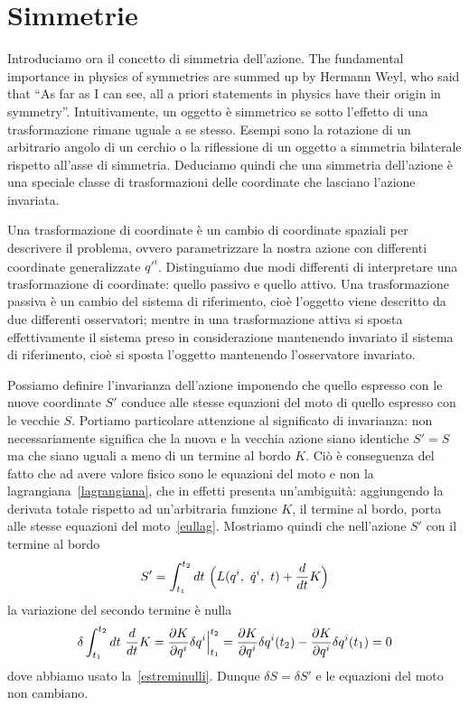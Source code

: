 \section{Simmetrie}
    
    Introduciamo ora il concetto di simmetria dell'azione. The fundamental importance in physics of symmetries are summed up by Hermann Weyl, who said that ``As far as I can see, all a priori statements in physics have their origin in symmetry''. Intuitivamente, un oggetto è simmetrico se sotto l'effetto di una trasformazione rimane uguale a se stesso. Esempi sono la rotazione di un arbitrario angolo di un cerchio o la riflessione di un oggetto a simmetria bilaterale rispetto all'asse di simmetria. Deduciamo quindi che una simmetria dell'azione è una speciale classe di trasformazioni delle coordinate che lasciano l'azione invariata. 
    
    Una trasformazione di coordinate è un cambio di coordinate spaziali per descrivere il problema, ovvero parametrizzare la nostra azione con differenti coordinate generalizzate $q'^i$. Distinguiamo due modi differenti di interpretare una trasformazione di coordinate: quello passivo e quello attivo. Una trasformazione passiva è un cambio del sistema di riferimento, cioè l'oggetto viene descritto da due differenti osservatori; mentre in una trasformazione attiva si sposta effettivamente il sistema preso in considerazione mantenendo invariato il sistema di riferimento, cioè si sposta l'oggetto mantenendo l'osservatore invariato. 
    
    Possiamo definire l'invarianza dell'azione imponendo che quello espresso con le nuove coordinate $S'$ conduce alle stesse equazioni del moto di quello espresso con le vecchie $S$. Portiamo particolare attenzione al significato di invarianza: non necessariamente significa che la nuova e la vecchia azione siano identiche $S' = S$ ma che siano uguali a meno di un termine al bordo $K$. Ciò è conseguenza del fatto che ad avere valore fisico sono le equazioni del moto e non la lagrangiana~\eqref{lagrangiana}, che in effetti presenta un'ambiguità: aggiungendo la derivata totale rispetto ad un'arbitraria funzione $K$, il termine al bordo, porta alle stesse equazioni del moto~\eqref{eullag}. Mostriamo quindi che nell'azione $S'$ con il termine al bordo
    \begin{equation*}
        S' = \int_{t_1}^{t_2}dt~ \Big ( L(q^i, ~ \dot q^i, ~t) + \frac{d}{dt} K \Big)
    \end{equation*}
    la variazione del secondo termine è nulla
    \begin{equation*}
        \delta \int_{t_1}^{t_2}dt~ \frac{d}{dt} K = \frac{\partial K}{\partial q^i} \delta q^i \Big \vert_{t_1}^{t_2} = \frac{\partial K}{\partial q^i} \delta q^i (t_2) - \frac{\partial K}{\partial q^i} \delta q^i (t_1) = 0
    \end{equation*} 
    dove abbiamo usato la~\eqref{estreminulli}. Dunque $\delta S = \delta S'$ e le equazioni del moto non cambiano.

